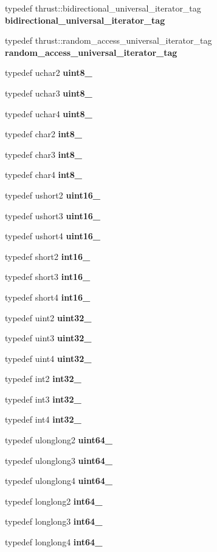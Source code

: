 \begin{DoxyCompactItemize}
\item 
typedef thrust\+::bidirectional\+\_\+universal\+\_\+iterator\+\_\+tag {\bfseries bidirectional\+\_\+universal\+\_\+iterator\+\_\+tag}
\item 
typedef thrust\+::random\+\_\+access\+\_\+universal\+\_\+iterator\+\_\+tag {\bfseries random\+\_\+access\+\_\+universal\+\_\+iterator\+\_\+tag}
\item 
typedef uchar2 {\bfseries uint8\+\_}
\item 
typedef uchar3 {\bfseries uint8\+\_}
\item 
typedef uchar4 {\bfseries uint8\+\_}
\item 
typedef char2 {\bfseries int8\+\_}
\item 
typedef char3 {\bfseries int8\+\_}
\item 
typedef char4 {\bfseries int8\+\_}
\item 
typedef ushort2 {\bfseries uint16\+\_}
\item 
typedef ushort3 {\bfseries uint16\+\_}
\item 
typedef ushort4 {\bfseries uint16\+\_}
\item 
typedef short2 {\bfseries int16\+\_}
\item 
typedef short3 {\bfseries int16\+\_}
\item 
typedef short4 {\bfseries int16\+\_}
\item 
typedef uint2 {\bfseries uint32\+\_}
\item 
typedef uint3 {\bfseries uint32\+\_}
\item 
typedef uint4 {\bfseries uint32\+\_}
\item 
typedef int2 {\bfseries int32\+\_}
\item 
typedef int3 {\bfseries int32\+\_}
\item 
typedef int4 {\bfseries int32\+\_}
\item 
typedef ulonglong2 {\bfseries uint64\+\_}
\item 
typedef ulonglong3 {\bfseries uint64\+\_}
\item 
typedef ulonglong4 {\bfseries uint64\+\_}
\item 
typedef longlong2 {\bfseries int64\+\_}
\item 
typedef longlong3 {\bfseries int64\+\_}
\item 
typedef longlong4 {\bfseries int64\+\_}
\item 
\mbox{\label{namespacecugar_a7ff174aa2400feda58755ac9c1bb50ad}} 

\end{DoxyCompactItemize}
